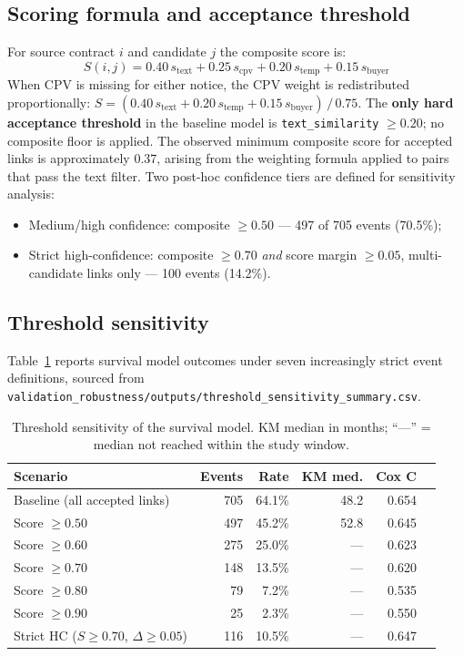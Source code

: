 \documentclass[11pt,a4paper]{article}
\begin{document}
\subsection*{Scoring formula and acceptance threshold}

For source contract $i$ and candidate $j$ the composite score is:
\[
  S(i,j) = 0.40\,s_{\mathrm{text}} + 0.25\,s_{\mathrm{cpv}}
          + 0.20\,s_{\mathrm{temp}} + 0.15\,s_{\mathrm{buyer}}
\]
When CPV is missing for either notice, the CPV weight is redistributed
proportionally: $S = (0.40\,s_{\mathrm{text}} + 0.20\,s_{\mathrm{temp}} +
0.15\,s_{\mathrm{buyer}})\,/\,0.75$.
The \textbf{only hard acceptance threshold} in the baseline model is
\texttt{text\_similarity} $\geq 0.20$; no composite floor is applied.
The observed minimum composite score for accepted links is approximately $0.37$,
arising from the weighting formula applied to pairs that pass the text filter.
Two post-hoc confidence tiers are defined for sensitivity analysis:
\begin{itemize}[nosep]
  \item Medium/high confidence: composite $\geq 0.50$ --- 497 of 705 events
        (70.5\%);
  \item Strict high-confidence: composite $\geq 0.70$ \emph{and} score margin
        $\geq 0.05$, multi-candidate links only --- 100 events (14.2\%).
\end{itemize}

\subsection*{Threshold sensitivity}

Table~\ref{tab:threshold_dq} reports survival model outcomes under seven
increasingly strict event definitions, sourced from
\texttt{validation\_robustness/outputs/threshold\_sensitivity\_summary.csv}.

\begin{table}[H]
\centering
\caption{Threshold sensitivity of the survival model. KM median in months;
``---'' = median not reached within the study window.}
\label{tab:threshold_dq}
\small
\begin{tabular}{@{}lrrrrr@{}}
\toprule
\textbf{Scenario} & \textbf{Events} & \textbf{Rate} & \textbf{KM med.}
  & \textbf{Cox C} \\
\midrule
Baseline (all accepted links) & 705 & 64.1\% & 48.2 & 0.654 \\
Score $\geq 0.50$             & 497 & 45.2\% & 52.8 & 0.645 \\
Score $\geq 0.60$             & 275 & 25.0\% & ---  & 0.623 \\
Score $\geq 0.70$             & 148 & 13.5\% & ---  & 0.620 \\
Score $\geq 0.80$             &  79 &  7.2\% & ---  & 0.535 \\
Score $\geq 0.90$             &  25 &  2.3\% & ---  & 0.550 \\
Strict HC ($S\!\geq\!0.70$, $\Delta\!\geq\!0.05$) & 116 & 10.5\% & --- & 0.647 \\
\bottomrule
\end{tabular}
\end{table}
\end{document}
